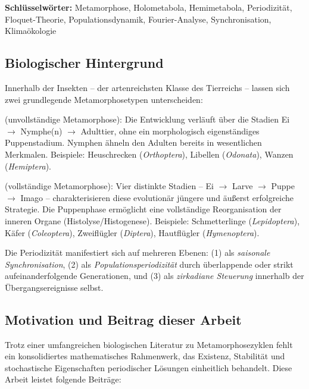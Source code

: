 ﻿\documentclass[12pt, a4paper]{article}
\theoremstyle{definition}
\begin{document}
\textbf{Schlüsselwörter:} Metamorphose, Holometabola, Hemimetabola, Periodizität,
Floquet-Theorie, Populationsdynamik, Fourier-Analyse, Synchronisation, Klimaökologie

\subsection{Biologischer Hintergrund}

Innerhalb der Insekten -- der artenreichsten Klasse des Tierreichs -- lassen
sich zwei grundlegende Metamorphosetypen unterscheiden:

\begin{description}[leftmargin=2cm, labelwidth=1.8cm]
  \item[\textbf{Hemimetabolie}] (unvollständige Metamorphose): Die Entwicklung
    verläuft über die Stadien Ei $\to$ Nymphe(n) $\to$ Adulttier, ohne ein
    morphologisch eigenständiges Puppenstadium. Nymphen ähneln den Adulten bereits
    in wesentlichen Merkmalen. Beispiele: Heuschrecken (\emph{Orthoptera}),
    Libellen (\emph{Odonata}), Wanzen (\emph{Hemiptera}).

  \item[\textbf{Holometabolie}] (vollständige Metamorphose): Vier distinkte Stadien
    -- Ei $\to$ Larve $\to$ Puppe $\to$ Imago -- charakterisieren diese evolutionär
    jüngere und äußerst erfolgreiche Strategie. Die Puppenphase ermöglicht eine
    vollständige Reorganisation der inneren Organe (Histolyse/Histogenese).
    Beispiele: Schmetterlinge (\emph{Lepidoptera}), Käfer (\emph{Coleoptera}),
    Zweiflügler (\emph{Diptera}), Hautflügler (\emph{Hymenoptera}).
\end{description}

Die Periodizität manifestiert sich auf mehreren Ebenen: (1) als \emph{saisonale
Synchronisation}, (2) als \emph{Populationsperiodizität} durch überlappende oder
strikt aufeinanderfolgende Generationen, und (3) als \emph{zirkadiane Steuerung}
innerhalb der Übergangsereignisse selbst.

\subsection{Motivation und Beitrag dieser Arbeit}

Trotz einer umfangreichen biologischen Literatur zu Metamorphosezyklen fehlt ein
konsolidiertes mathematisches Rahmenwerk, das Existenz, Stabilität und stochastische
Eigenschaften periodischer Lösungen einheitlich behandelt. Diese Arbeit leistet
folgende Beiträge:
\end{document}

